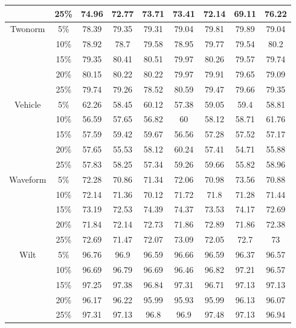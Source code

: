 \begin{longtable}[c]{|c|c|c|c|c|c|c|c|c|}
& 25\% & 74.96 & 72.77 & 73.71 & 73.41 & 72.14 & 69.11 & 76.22 \\ \hline
\multirow{5}{*}{Twonorm}
& 5\% & 78.39 & 79.35 & 79.31 & 79.04 & 79.81 & 79.89 & 79.04 \\
& 10\% & 78.92 & 78.7 & 79.58 & 78.95 & 79.77 & 79.54 & 80.2 \\
& 15\% & 79.35 & 80.41 & 80.51 & 79.97 & 80.26 & 79.57 & 79.74 \\
& 20\% & 80.15 & 80.22 & 80.22 & 79.97 & 79.91 & 79.65 & 79.09 \\
& 25\% & 79.74 & 79.26 & 78.52 & 80.59 & 79.47 & 79.66 & 79.35 \\ \hline
\multirow{5}{*}{Vehicle}
& 5\% & 62.26 & 58.45 & 60.12 & 57.38 & 59.05 & 59.4 & 58.81 \\
& 10\% & 56.59 & 57.65 & 56.82 & 60 & 58.12 & 58.71 & 61.76 \\
& 15\% & 57.59 & 59.42 & 59.67 & 56.56 & 57.28 & 57.52 & 57.17 \\
& 20\% & 57.65 & 55.53 & 58.12 & 60.24 & 57.41 & 54.71 & 55.88 \\
& 25\% & 57.83 & 58.25 & 57.34 & 59.26 & 59.66 & 55.82 & 58.96 \\ \hline
\multirow{5}{*}{Waveform}
& 5\% & 72.28 & 70.86 & 71.34 & 72.06 & 70.98 & 73.56 & 70.88 \\
& 10\% & 72.14 & 71.36 & 70.12 & 71.72 & 71.8 & 71.28 & 71.44 \\
& 15\% & 73.19 & 72.53 & 74.39 & 74.37 & 73.53 & 74.17 & 72.69 \\
& 20\% & 71.84 & 72.14 & 72.73 & 71.86 & 72.89 & 71.86 & 72.38 \\
& 25\% & 72.69 & 71.47 & 72.07 & 73.09 & 72.05 & 72.7 & 73 \\ \hline
\multirow{5}{*}{Wilt}
& 5\% & 96.76 & 96.9 & 96.59 & 96.66 & 96.59 & 96.37 & 96.57 \\
& 10\% & 96.69 & 96.79 & 96.69 & 96.46 & 96.82 & 97.21 & 96.57 \\
& 15\% & 97.25 & 97.38 & 96.84 & 97.31 & 96.71 & 97.13 & 97.13 \\
& 20\% & 96.17 & 96.22 & 95.99 & 95.93 & 95.99 & 96.13 & 96.07 \\
& 25\% & 97.31 & 97.13 & 96.8 & 96.9 & 97.48 & 97.13 & 96.94 \\ \hline
\end{longtable}

